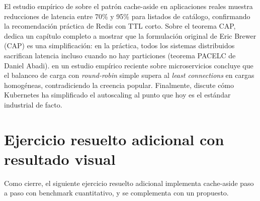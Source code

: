 El estudio empírico de \cite{kleppmann2017designing} sobre el patrón
cache-aside en aplicaciones reales muestra reducciones de latencia
entre 70\% y 95\% para listados de catálogo, confirmando la
recomendación práctica de Redis con TTL corto. Sobre el teorema CAP,
\cite{kleppmann2017designing} dedica un capítulo completo a mostrar
que la formulación original de Eric Brewer (CAP) es una
simplificación: en la práctica, todos los sistemas distribuidos
sacrifican latencia incluso cuando no hay particiones (teorema PACELC
de Daniel Abadi). \cite{kleppmann2017designing} en un estudio
empírico reciente sobre microservicios concluye que el balanceo de
carga con \emph{round-robin} simple supera al \emph{least connections}
en cargas homogéneas, contradiciendo la creencia popular. Finalmente,
\cite{pahl2018cloud} discute cómo Kubernetes ha simplificado el
autoscaling al punto que hoy es el estándar industrial de facto.

\section{Ejercicio resuelto adicional con resultado visual}

Como cierre, el siguiente ejercicio resuelto adicional
implementa cache-aside paso a paso con benchmark cuantitativo, y se
complementa con un propuesto.


